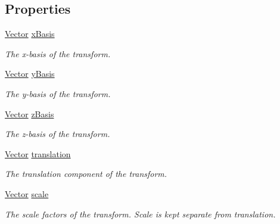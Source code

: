 \subsection*{Properties}
\begin{DoxyCompactItemize}
\item 
\mbox{\hyperlink{struct_leap_1_1_vector}{Vector}} \mbox{\hyperlink{struct_leap_1_1_leap_transform_a8a67b81b7344f05e136048e2159ab663}{x\+Basis}}
\begin{DoxyCompactList}\small\item\em The x-\/basis of the transform. \end{DoxyCompactList}\item 
\mbox{\hyperlink{struct_leap_1_1_vector}{Vector}} \mbox{\hyperlink{struct_leap_1_1_leap_transform_ac46874ef78036f1bc2d2bf76dd9a62a2}{y\+Basis}}
\begin{DoxyCompactList}\small\item\em The y-\/basis of the transform. \end{DoxyCompactList}\item 
\mbox{\hyperlink{struct_leap_1_1_vector}{Vector}} \mbox{\hyperlink{struct_leap_1_1_leap_transform_a59e5ecf307c5938bf9e04902b8395f8a}{z\+Basis}}
\begin{DoxyCompactList}\small\item\em The z-\/basis of the transform. \end{DoxyCompactList}\item 
\mbox{\hyperlink{struct_leap_1_1_vector}{Vector}} \mbox{\hyperlink{struct_leap_1_1_leap_transform_ac7de7c75b3f77718715055990131f08b}{translation}}
\begin{DoxyCompactList}\small\item\em The translation component of the transform. \end{DoxyCompactList}\item 
\mbox{\hyperlink{struct_leap_1_1_vector}{Vector}} \mbox{\hyperlink{struct_leap_1_1_leap_transform_ac8b265b9dfa089183c263bbe7ff0e42d}{scale}}
\begin{DoxyCompactList}\small\item\em The scale factors of the transform. Scale is kept separate from translation. \end{DoxyCompactList}\item 

\end{DoxyCompactItemize}
